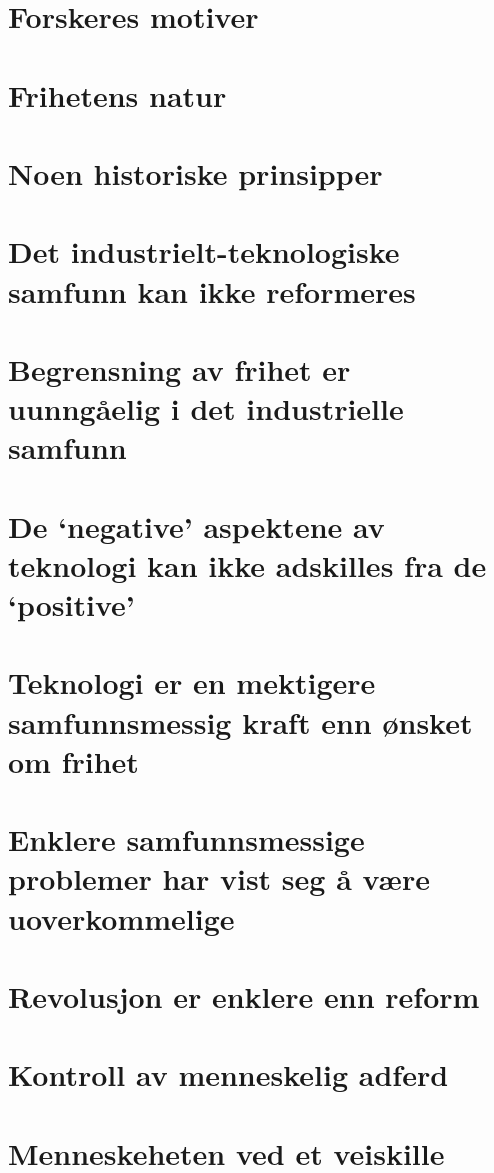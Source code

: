 \documentclass[oneside]{book}
\begin{document}
\chapter{Forskeres motiver}

\chapter{Frihetens natur}

\chapter{Noen historiske prinsipper}

\chapter{Det industrielt-teknologiske samfunn kan ikke reformeres}

\chapter{Begrensning av frihet er uunngåelig i det industrielle samfunn}

\chapter{De `negative' aspektene av teknologi kan ikke adskilles fra de `positive'}

\chapter{Teknologi er en mektigere samfunnsmessig kraft enn ønsket om frihet}

\chapter{Enklere samfunnsmessige problemer har vist seg å være uoverkommelige}

\chapter{Revolusjon er enklere enn reform}

\chapter{Kontroll av menneskelig adferd}

\chapter{Menneskeheten ved et veiskille}
\end{document}
